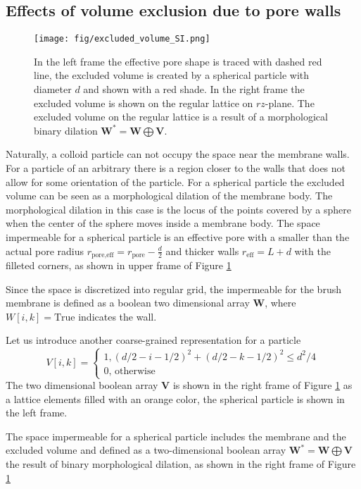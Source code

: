 \documentclass[10pt, a4paper]{article}
\begin{document}
\subsection*{Effects of volume exclusion due to pore walls}

\begin{multicols}{2}

\begin{figure}[H]
    \centering
    \texttt{[image: fig/excluded\_volume\_SI.png]}
    \caption{
        In the left frame the effective pore shape is traced with dashed red line, the excluded volume is created by a spherical particle with diameter $d$ and shown with a red shade.
        In the right frame the excluded volume is shown on the regular lattice on $rz$-plane.
        The excluded volume on the regular lattice is a result of a morphological binary dilation $\bm{W}^{\ast} = \bm{W} \bigoplus \bm{V}$.
        }
    \label{fig:excluded_volume}
\end{figure}

Naturally, a colloid particle can not occupy the space near the membrane walls. 
For a particle of an arbitrary there is a region closer to the walls that does not allow for some orientation of the particle.
For a spherical particle the excluded volume can be seen as a morphological dilation of the membrane body.
The morphological dilation in this case is the locus of the points covered by a sphere when the center of the sphere moves inside a membrane body.
The space impermeable for a spherical particle is an effective pore with a smaller than the actual pore radius $r_{\textrm{pore,eff}} = r_{\textrm{pore}} - \frac{d}{2}$ and thicker walls $r_{\textrm{eff}} = L+d$ with the filleted corners, as shown in upper frame of Figure \ref{fig:excluded_volume}

Since the space is discretized into regular grid, the impermeable for the brush membrane is defined as a boolean two dimensional array $\bm{W}$, where $W[i,k] = \textrm{True}$ indicates the wall.

Let us introduce another coarse-grained representation for a particle
\begin{equation}
    V[i, k] = 
    \begin{cases}
            \textrm{1}, (d/2-i-1/2)^2 + (d/2-k-1/2)^2 \le d^2/4
            \\
            \textrm{0, otherwise}
        \end{cases}
\end{equation}
The two dimensional boolean array $\bm{V}$ is shown in the right frame of Figure \ref{fig:excluded_volume} as a lattice elements filled with an orange color, the spherical particle is shown in the left frame. 

The space impermeable for a spherical particle includes the membrane and the excluded volume and defined as a two-dimensional boolean array $\bm{W}^{\ast} = \bm{W} \bigoplus \bm{V}$ the result of binary morphological dilation, as shown in the right frame of Figure \ref{fig:excluded_volume}

\end{multicols}
\end{document}
